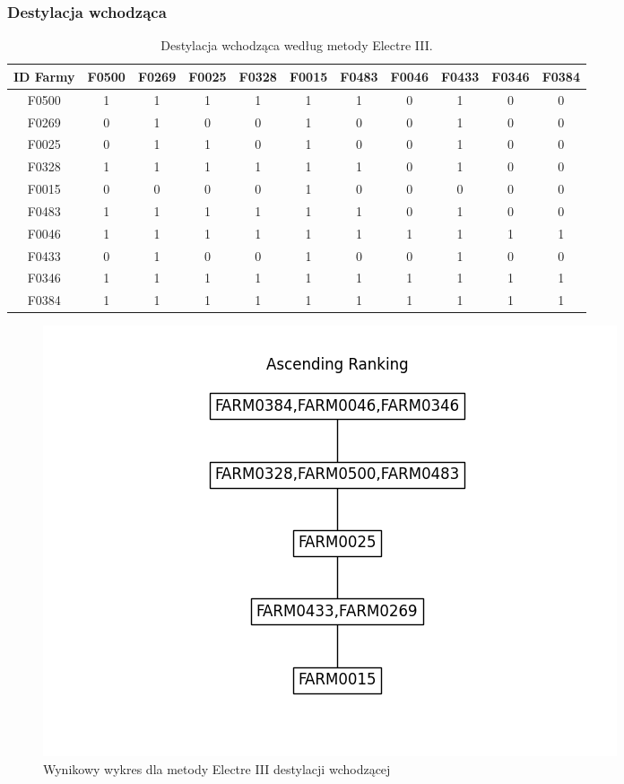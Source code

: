 \documentclass[11pt]{article}
\begin{document}
\subsubsection{Destylacja wchodząca}
\begin{table}[H]
\centering
\begin{tabular}{|c||c|c|c|c|c|c|c|c|c|c|}
\hline
\textbf{ID Farmy} & \textbf{F0500} & \textbf{F0269} & \textbf{F0025} & \textbf{F0328} & \textbf{F0015} & \textbf{F0483} & \textbf{F0046} & \textbf{F0433} & \textbf{F0346} & \textbf{F0384} \\
\hline
F0500 & 1 & 1 & 1 & 1 & 1 & 1 & 0 & 1 & 0 & 0 \\
\hline
F0269 & 0 & 1 & 0 & 0 & 1 & 0 & 0 & 1 & 0 & 0 \\
\hline
F0025 & 0 & 1 & 1 & 0 & 1 & 0 & 0 & 1 & 0 & 0 \\
\hline
F0328 & 1 & 1 & 1 & 1 & 1 & 1 & 0 & 1 & 0 & 0 \\
\hline
F0015 & 0 & 0 & 0 & 0 & 1 & 0 & 0 & 0 & 0 & 0 \\
\hline
F0483 & 1 & 1 & 1 & 1 & 1 & 1 & 0 & 1 & 0 & 0 \\
\hline
F0046 & 1 & 1 & 1 & 1 & 1 & 1 & 1 & 1 & 1 & 1 \\
\hline
F0433 & 0 & 1 & 0 & 0 & 1 & 0 & 0 & 1 & 0 & 0 \\
\hline
F0346 & 1 & 1 & 1 & 1 & 1 & 1 & 1 & 1 & 1 & 1 \\
\hline
F0384 & 1 & 1 & 1 & 1 & 1 & 1 & 1 & 1 & 1 & 1 \\
\hline
\end{tabular}
\caption{Destylacja wchodząca według metody Electre III.}
\end{table}

\begin{figure}[H]
	\centering
	\includegraphics[scale=0.75]{output/Ascending Ranking.png}
	\caption{Wynikowy wykres dla metody Electre III destylacji wchodzącej}
\end{figure}
\end{document}
